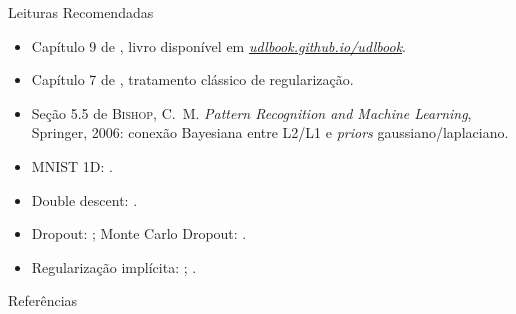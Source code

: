\documentclass[aspectratio=169,xcolor=dvipsnames]{beamer}
\begin{document}
  \begin{frame}{Leituras Recomendadas}
    \leiturasize
    \sloppy
    \begin{itemize}
      \item Capítulo 9 de , livro disponível em
        \href{https://udlbook.github.io/udlbook/}{\textit{udlbook.github.io/udlbook}}.
      \item Capítulo 7 de , tratamento clássico de regularização.
      \item Seção 5.5 de \textsc{Bishop}, C.\ M. \textit{Pattern Recognition and Machine Learning}, Springer, 2006: conexão Bayesiana entre L2/L1 e \textit{priors} gaussiano/laplaciano.
      \item MNIST 1D: .
      \item Double descent: .
      \item Dropout: ; Monte Carlo
        Dropout: .
      \item Regularização implícita: ;
        .
    \end{itemize}
  \end{frame}

  \begin{frame}[allowframebreaks]{Referências}
    \sloppy
    \printbibliography[heading=none]
  \end{frame}
\end{document}
